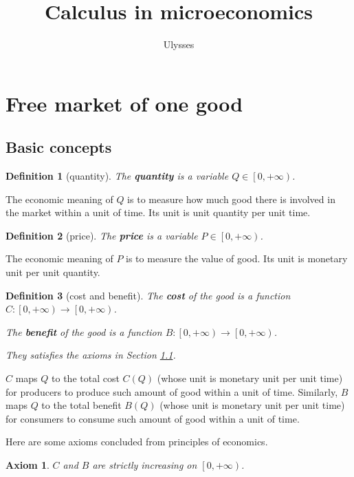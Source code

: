 \documentclass{article}
\title{Calculus in microeconomics}
\author{Ulysses}
\newtheorem{axiom}{Axiom}[subsection]
\newtheorem{definition}{Definition}[subsection]
\begin{document}
\maketitle

\tableofcontents

\section{Free market of one good}

\subsection{Basic concepts}
\label{basic}

\begin{definition}[quantity]
The \textbf{quantity} is a variable $Q\in\left[0,+\infty\right)$.
\end{definition}

The economic meaning of $Q$ is to measure how much good there is involved in the market within a unit of time.
Its unit is unit quantity per unit time.

\begin{definition}[price]
The \textbf{price} is a variable $P\in\left[0,+\infty\right)$.
\end{definition}

The economic meaning of $P$ is to measure the value of good.
Its unit is monetary unit per unit quantity.

\begin{definition}[cost and benefit]
The \textbf{cost} of the good is a function $C:\left[0,+\infty\right)\to\left[0,+\infty\right)$.

The \textbf{benefit} of the good is a function $B:\left[0,+\infty\right)\to\left[0,+\infty\right)$.

They satisfies the axioms in Section \ref{basic}.
\end{definition}

$C$ maps $Q$ to the total cost $C\left(Q\right)$ (whose unit is monetary unit per unit time) for producers to produce such amount of good within a unit of time.
Similarly, $B$ maps $Q$ to the total benefit $B\left(Q\right)$ (whose unit is monetary unit per unit time) for consumers to consume such amount of good within a unit of time.

Here are some axioms concluded from principles of economics.

\begin{axiom}
\label{monoticity}
$C$ and $B$ are strictly increasing on $\left[0,+\infty\right)$.
\end{axiom}
\end{document}
